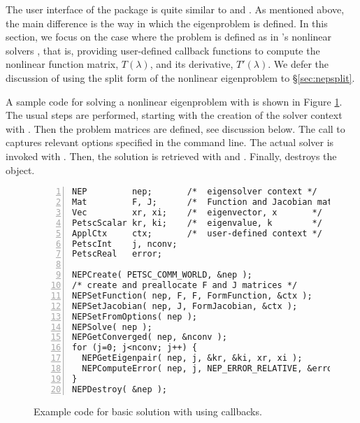 The user interface of the  package is quite similar to  and . As mentioned above, the main difference is the way in which the eigenproblem is defined. In this section, we focus on the case where the problem is defined as in \petsc's nonlinear solvers , that is, providing user-defined callback functions to compute the nonlinear function matrix, $T(\lambda)$, and its derivative, $T'(\lambda)$. We defer the discussion of using the split form of the nonlinear eigenproblem to \S\ref{sec:nepsplit}.

A sample code for solving a nonlinear eigenproblem with  is shown in Figure \ref{fig:ex-nep}. The usual steps are performed, starting with the creation of the solver context with . Then the problem matrices are defined, see discussion below. The call to  captures relevant options specified in the command line. The actual solver is invoked with . Then, the solution is retrieved with  and . Finally,  destroys the object.

\begin{figure}
\begin{Verbatim}[fontsize=\small,numbers=left,numbersep=6pt,xleftmargin=15mm]
NEP         nep;       /*  eigensolver context */
Mat         F, J;      /*  Function and Jacobian matrices  */
Vec         xr, xi;    /*  eigenvector, x       */
PetscScalar kr, ki;    /*  eigenvalue, k        */
ApplCtx     ctx;       /*  user-defined context */
PetscInt    j, nconv;
PetscReal   error;

NEPCreate( PETSC_COMM_WORLD, &nep );
/* create and preallocate F and J matrices */
NEPSetFunction( nep, F, F, FormFunction, &ctx );
NEPSetJacobian( nep, J, FormJacobian, &ctx );
NEPSetFromOptions( nep );
NEPSolve( nep );
NEPGetConverged( nep, &nconv );
for (j=0; j<nconv; j++) {
  NEPGetEigenpair( nep, j, &kr, &ki, xr, xi );
  NEPComputeError( nep, j, NEP_ERROR_RELATIVE, &error );
}
NEPDestroy( &nep );
\end{Verbatim}
\caption{\label{fig:ex-nep}Example code for basic solution with  using callbacks.}
\end{figure}

